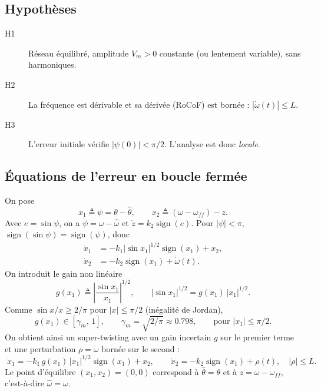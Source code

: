 \documentclass[11pt,a4paper]{article}
\newcommand{\sign}{\operatorname{sign}}
\newcommand{\hth}{\hat{\theta}}
\newcommand{\hw}{\hat{\omega}}
\begin{document}
\subsection{Hypothèses}
\begin{description}
  \item[H1] Réseau équilibré, amplitude $V_m>0$ constante (ou lentement variable), sans harmoniques.
  \item[H2] La fréquence est dérivable et sa dérivée (RoCoF) est bornée : $|\dot\omega(t)|\le L$.
  \item[H3] L'erreur initiale vérifie $|\psi(0)|<\pi/2$. L'analyse est donc \emph{locale}.
\end{description}

\subsection{Équations de l'erreur en boucle fermée}
On pose
\begin{equation}
x_1 \triangleq \psi = \theta-\hth, \qquad x_2 \triangleq (\omega-\omega_{ff}) - z .
\end{equation}
Avec $e=\sin\psi$, on a $\dot\psi=\omega-\hw$ et $\dot z = k_2\sign(e)$. Pour $|\psi|<\pi$,
$\sign(\sin\psi)=\sign(\psi)$, donc
\begin{align}
\dot x_1 &= -k_1|\sin x_1|^{1/2}\sign(x_1) + x_2, \\
\dot x_2 &= -k_2\sign(x_1) + \dot\omega(t).
\end{align}
On introduit le gain non linéaire
\begin{equation}
g(x_1) \triangleq \left|\frac{\sin x_1}{x_1}\right|^{1/2},
\qquad |\sin x_1|^{1/2} = g(x_1)\,|x_1|^{1/2}.
\end{equation}
Comme $\sin x/x \ge 2/\pi$ pour $|x|\le\pi/2$ (inégalité de Jordan),
\begin{equation}
g(x_1)\in[\gamma_m,\,1], \qquad \gamma_m = \sqrt{2/\pi}\approx 0.798, \qquad \text{pour } |x_1|\le \pi/2 .
\end{equation}
On obtient ainsi un super-twisting avec un gain incertain $g$ sur le premier terme et une
perturbation $\rho=\dot\omega$ bornée sur le second :
\begin{equation}\label{eq:bf}
\boxed{\;
\dot x_1 = -k_1\, g(x_1)\,|x_1|^{1/2}\sign(x_1) + x_2, \qquad
\dot x_2 = -k_2\sign(x_1) + \rho(t), \quad |\rho|\le L .\;}
\end{equation}
Le point d'équilibre $(x_1,x_2)=(0,0)$ correspond à $\hth=\theta$ et à $z=\omega-\omega_{ff}$,
c'est-à-dire $\hw=\omega$.
\end{document}
